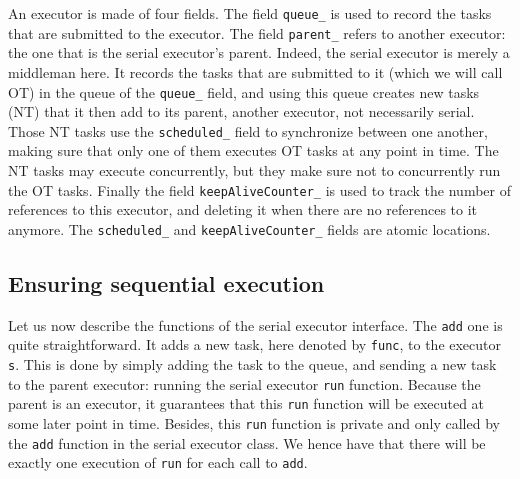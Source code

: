 An executor is made of four fields. The field \texttt{queue\_} is used to record the tasks that are submitted to the executor. The field \texttt{parent\_} refers to another executor: the one that is the serial executor's parent. Indeed, the serial executor is merely a middleman here. It records the tasks that are submitted to it (which we will call OT) in the queue of the \texttt{queue\_} field, and using this queue creates new tasks (NT) that it then add to its parent, another executor, not necessarily serial. Those NT tasks use the \texttt{scheduled\_} field to synchronize between one another, making sure that only one of them executes OT tasks at any point in time. The NT tasks may execute concurrently, but they make sure not to concurrently run the OT tasks.
Finally the field \texttt{keepAliveCounter\_} is used to track the number of references to this executor, and deleting it when there are no references to it anymore. The \texttt{scheduled\_} and \texttt{keepAliveCounter\_} fields are atomic locations.

\subsection{Ensuring sequential execution}
Let us now describe the functions of the serial executor interface. The \texttt{add} one is quite straightforward. It adds a new task, here denoted by \texttt{func}, to the executor \texttt{s}. This is done by simply adding the task to the queue, and sending a new task to the parent executor: running the serial executor \texttt{run} function. Because the parent is an executor, it guarantees that this \texttt{run} function will be executed at some later point in time. Besides, this \texttt{run} function is private and only called by the \texttt{add} function in the serial executor class. We hence have that there will be exactly one execution of \texttt{run} for each call to \texttt{add}. 

